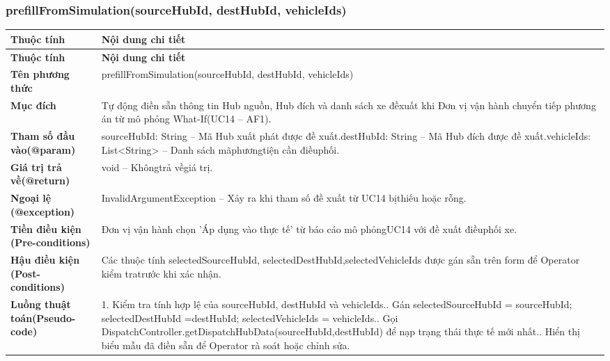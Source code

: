 \subsubsection{prefillFromSimulation(sourceHubId, destHubId, vehicleIds)}
\begin{longtable}{|L{0.24\textwidth}|L{0.70\textwidth}|}
\hline
\textbf{Thuộc tính} & \textbf{Nội dung chi tiết} \\
\hline
\endfirsthead
\hline
\textbf{Thuộc tính} & \textbf{Nội dung chi tiết} \\
\hline
\endhead
\textbf{Tên phương thức} & prefillFromSimulation(sourceHubId, destHubId, vehicleIds) \\
\hline
\textbf{Mục đích} & Tự động điền sẵn thông tin Hub nguồn, Hub đích và danh sách xe đề\newline xuất khi Đơn vị vận hành chuyển tiếp phương án từ mô phỏng What-\newline If(UC14 – AF1). \\
\hline
\textbf{Tham số đầu vào}\newline \textbf{(@param)} & sourceHubId: String – Mã Hub xuất phát được đề xuất.\newline destHubId: String – Mã Hub đích được đề xuất.\newline vehicleIds: List<String> – Danh sách mãphươngtiện cần điềuphối. \\
\hline
\textbf{Giá trị trả về(@return)} & void – Khôngtrả vềgiá trị. \\
\hline
\textbf{Ngoại lệ (@exception)} & InvalidArgumentException – Xảy ra khi tham số đề xuất từ UC14 bị\newline thiếu hoặc rỗng. \\
\hline
\textbf{Tiền điều kiện (Pre-}\newline \textbf{conditions)} & Đơn vị vận hành chọn 'Áp dụng vào thực tế' từ báo cáo mô phỏng\newline UC14 với đề xuất điềuphối xe. \\
\hline
\textbf{Hậu điều kiện (Post-}\newline \textbf{conditions)} & Các thuộc tính selectedSourceHubId, selectedDestHubId,\newline selectedVehicleIds được gán sẵn trên form để Operator kiểm tra\newline trước khi xác nhận. \\
\hline
\textbf{Luồng thuật toán}\newline \textbf{(Pseudo-code)} & 1. Kiểm tra tính hợp lệ của sourceHubId, destHubId và vehicleIds.. Gán selectedSourceHubId = sourceHubId; selectedDestHubId =\newline destHubId; selectedVehicleIds = vehicleIds.. Gọi DispatchController.getDispatchHubData(sourceHubId,\newline destHubId) để nạp trạng thái thực tế mới nhất.. Hiển thị biểu mẫu đã điền sẵn để Operator rà soát hoặc chỉnh sửa. \\
\hline
\end{longtable}
\vspace{-0.5\baselineskip}
